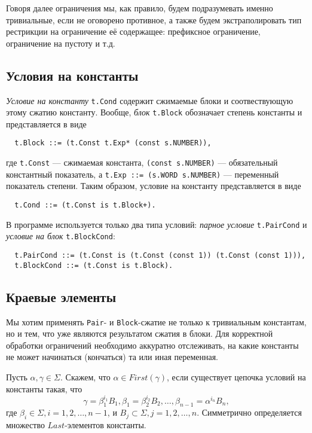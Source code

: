\documentclass[12pt]{article}
\begin{document}
Говоря далее ограничения мы, как правило, будем подразумевать именно
тривиальные, если не оговорено противное, а также будем экстраполировать
тип рестрикции на ограничение её содержащее: префиксное ограничение,
ограничение на пустоту и т.д.

\subsection{Условия на константы}

\textit{Условие на константу} \texttt{t.Cond} содержит сжимаемые блоки и
соотвествующую этому сжатию константу. Вообще, \textit{блок} \texttt{t.Block}
обозначает степень константы и представляется в виде
\begin{Verbatim}
  t.Block ::= (t.Const t.Exp* (const s.NUMBER)),
\end{Verbatim}
где \texttt{t.Const} --- сжимаемая константа, \texttt{(const s.NUMBER)} ---
обязательный константный показатель, а \texttt{t.Exp ::= (s.WORD s.NUMBER)}
--- переменный показатель степени. Таким образом, условие на константу
представляется в виде
\begin{Verbatim}
  t.Cond ::= (t.Const is t.Block+).
\end{Verbatim}
В программе используется только два типа условий: \textit{парное условие}
\texttt{t.PairCond} и \textit{условие на блок} \texttt{t.BlockCond}:
\begin{Verbatim}
  t.PairCond ::= (t.Const is (t.Const (const 1)) (t.Const (const 1))),
  t.BlockCond ::= (t.Const is t.Block).
\end{Verbatim}

\subsection{Краевые элементы}

Мы хотим применять \texttt{Pair}- и \texttt{Block}-сжатие не только к
тривиальным константам, но и тем, что уже являются результатом сжатия в блоки.
Для корректной обработки ограничений необходимо аккуратно отслеживать, на какие
константы не может начинаться (кончаться) та или иная переменная.

Пусть $\alpha, \gamma \in \Sigma$. Скажем, что $\alpha \in First(\gamma)$, если
существует цепочка условий на константы такая, что
\begin{displaymath}
  \gamma = \beta_1^{i_1} B_1,
  \beta_1 = \beta_2^{i_2} B_2,
  \dots,
  \beta_{n-1} = \alpha^{i_n} B_n,
\end{displaymath}
где $\beta_i \in \Sigma, i = 1, 2, \dots, n - 1$, и $B_j \subset \Sigma, j = 1,
2, \dots, n$. Симметрично определяется множество $Last$-элементов константы.
\end{document}
